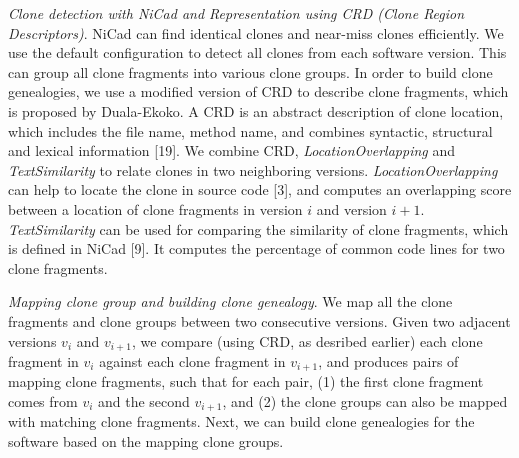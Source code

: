 {\em Clone detection with NiCad and Representation using CRD (Clone Region Descriptors)}. NiCad %
can find identical clones and near-miss clones efficiently. We use the default configuration to detect all clones from each software version. %
This can group all clone fragments into various clone groups. %
In order to build clone genealogies, we use a modified version of CRD to describe clone fragments, which is proposed by Duala-Ekoko. 
A CRD is an abstract description of clone location, which includes the file name, method name, and combines syntactic, structural and lexical information [19]. %
We combine CRD, {\em LocationOverlapping} and {\em TextSimilarity} to relate clones in two neighboring versions.   {\em LocationOverlapping} can help to locate the clone in source code [3], and computes an overlapping score between a location of clone fragments in version $i$ and version $i+1$. {\em TextSimilarity} can be used for comparing the similarity of clone fragments, which is defined in NiCad [9]. It computes the percentage of common code lines for two clone fragments. 


{\em Mapping clone group and building clone genealogy}. %
We map all the clone fragments and clone groups between two consecutive versions. %
Given two adjacent versions {\em $v_i$} and {\em $v_{i+1}$}, we compare (using CRD, as desribed earlier) each clone fragment in {\em $v_i$} against each clone fragment in {\em $v_{i+1}$}, and produces pairs of mapping clone fragments, such that for each pair, (1) the first clone fragment comes from {\em $v_i$} and the second {\em $v_{i+1}$}, and (2) the clone groups  can also be mapped with matching clone fragments. %
Next, we can build clone genealogies for the software based on the mapping clone groups.  %

